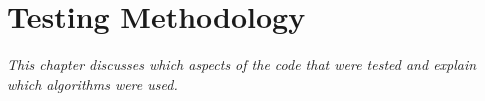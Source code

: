 \chapter{Testing Methodology}

\textit{This chapter discusses which aspects of the code that were tested and explain which algorithms were used.}



